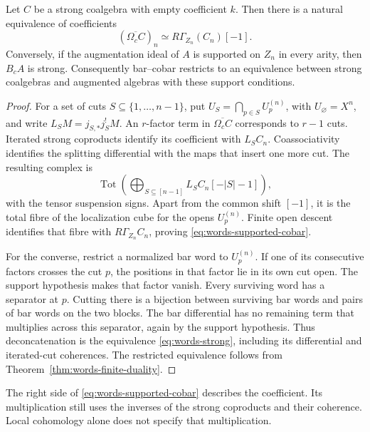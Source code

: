 \begin{theorem}
\label{thm:words-support}
Let \(C\) be a strong coalgebra with empty coefficient \(k\).
Then there is a natural equivalence of coefficients
\begin{equation}
 (\overline{\Omega_c C})_n
       \simeq R\Gamma_{Z_n}(C_n)[-1].
 \label{eq:words-supported-cobar}
\end{equation}
Conversely, if the augmentation ideal of \(A\) is supported on
\(Z_n\) in every arity, then \(B_cA\) is strong.  Consequently
bar--cobar restricts to an equivalence between strong coalgebras
and augmented algebras with these support conditions.
\end{theorem}
\begin{proof}
For a set of cuts \(S\subseteq\{1,\ldots,n-1\}\), put
\(U_S=\bigcap_{p\in S}U_p^{(n)}\), with \(U_\varnothing=X^n\),
and write \(L_S M=j_{S,*}j_S^!M\).  An \(r\)-factor term in
\(\overline{\Omega_c C}\) corresponds to \(r-1\) cuts.  Iterated
strong coproducts identify its coefficient with \(L_S C_n\).
Coassociativity identifies the splitting differential with the
maps that insert one more cut.  The resulting complex is
\[
 \operatorname{Tot}
 \left(\bigoplus_{S\subseteq[n-1]}L_SC_n[-|S|-1]\right),
\]
with the tensor suspension signs.  Apart from the common shift
\([-1]\), it is the total fibre of the localization cube for the
opens \(U_p^{(n)}\).  Finite open descent identifies that fibre
with \(R\Gamma_{Z_n}C_n\), proving
\eqref{eq:words-supported-cobar}.

For the converse, restrict a normalized bar word to \(U_p^{(n)}\).
If one of its consecutive factors crosses the cut \(p\), the
positions in that factor lie in its own cut open.  The support
hypothesis makes that factor vanish.  Every surviving word has
a separator at \(p\).  Cutting there is a bijection between
surviving bar words and pairs of bar words on the two blocks.
The bar differential has no remaining term that multiplies
across this separator, again by the support hypothesis.  Thus
deconcatenation is the equivalence \eqref{eq:words-strong},
including its differential and iterated-cut coherences.
The restricted equivalence follows from
Theorem~\ref{thm:words-finite-duality}.
\end{proof}

The right side of \eqref{eq:words-supported-cobar} describes the
coefficient.  Its multiplication still uses the inverses of the
strong coproducts and their coherence.  Local cohomology alone
does not specify that multiplication.

